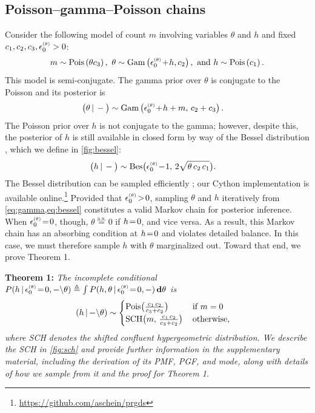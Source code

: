\documentclass{article}
\begin{document}
\subsection{Poisson--gamma--Poisson chains}
\label{sec:recursion}
Consider the following model of count $m$ involving variables $\theta$ and $h$ and fixed $c_1, c_2, c_3, \epstheta >0$:
\begin{equation}
m \sim \Pois{\theta c_3},\,\,
%
\theta \sim \Gam{\epstheta \tp h, c_2},\,\,
%
\textrm{and}\,\, h \sim \Pois{c_1}.
\end{equation}
This model is semi-conjugate. The gamma prior over $\theta$ is conjugate to the Poisson and its posterior is
%
\begin{align}
\label{eq:gamma}
\compcond{\theta} &\sim \Gam{\epstheta \tp h + m,\, c_2 + c_3}.
\end{align}
The Poisson prior over $h$ is not conjugate to the gamma; however, despite this, the posterior of $h$ is still available in closed form by way of the Bessel distribution \cite{yuan2000bessel}, which we define in \cref{fig:bessel}:
\begin{align}
\label{eq:bessel}
\compcond{h} &\sim \textrm{Bes}\big(\epstheta \tm 1,\, 2\sqrt{\theta \,c_2\, c_1}\big).
\end{align}
The Bessel distribution can be sampled efficiently \cite{devroye2002simulating}; our Cython implementation is available online.\footnote{\url{https://github.com/aschein/prgds}}
Provided that $\epstheta \!>\! 0$, sampling $\theta$ and $h$ iteratively from \cref{eq:gamma,eq:bessel} constitutes a valid Markov chain for posterior inference. When $\epstheta \teq 0$, though, $\theta \stackrel{\textrm{a.s.}}{=} 0$ if $h \!=\! 0$, and vice versa. As a result, this Markov chain has an absorbing condition at $h \!=\! 0$ and violates detailed balance. In this case, we must therefore sample $h$ with $\theta$ marginalized out. Toward that end, we prove Theorem 1.~

\textbf{Theorem 1:} \textit{The incomplete conditional $P(h\given{\epstheta \teq 0, -\backslash} \theta)\triangleq \int P(h,\theta\given \epstheta \teq 0, -)\,\mathbf{d}\theta$ is}~
\begin{align}
\label{eq:sch}
\left(h \,|\, {-\backslash} \theta\right) &\sim
\begin{cases}
\textrm{Pois}\big(\frac{c_1\,c_2}{c_3+c_2}\big) &\textrm{if }m=0\\
\textrm{SCH}\big(m,\, \frac{c_1\,c_2}{c_3+c_2}\big)\, &\textrm{otherwise,}
\end{cases}
\end{align}
\textit{where SCH denotes the shifted confluent hypergeometric distribution. We describe the SCH in \cref{fig:sch} and provide further information in the supplementary material, including the derivation of its PMF, PGF, and mode, along with details of how we sample from it and the proof for Theorem 1.}~
\end{document}
